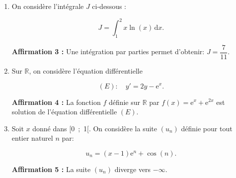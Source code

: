\documentclass[10pt]{article}
\providecommand{\R}{\mathbb{R}}
\providecommand{\e}{{\mathrm{e}}}
\providecommand{\no}{{\text{n°}}}
\begin{document}
\begin{enumerate}[start=3]
\item On considère l'intégrale $J$ ci-dessous : 

\[J = \displaystyle\int_1^2 x \ln (x)\,\text{d}x.\]

\textbf{Affirmation \no 3 :} Une intégration par parties permet d'obtenir: $J = \dfrac{7}{11}$.

\item Sur $\R$, on considère l'équation différentielle 

\[(E) :\quad  y' = 2y - \e^x.\]

\textbf{Affirmation \no 4 :} La fonction $f$ définie sur $\R$ par $f(x) = \e^x + \e^{2x}$ est solution de l'équation différentielle $(E)$.
\item  Soit $x$ donné dans [0~;~1[. On considère la suite $(u_n)$ définie pour tout entier naturel $n$ par:

\[u_n = (x - 1)\e^n + \cos (n).\]

\textbf{Affirmation \no 5 :} La suite $(u_n)$ diverge vers $-\infty.$
\end{enumerate}
\end{document}
